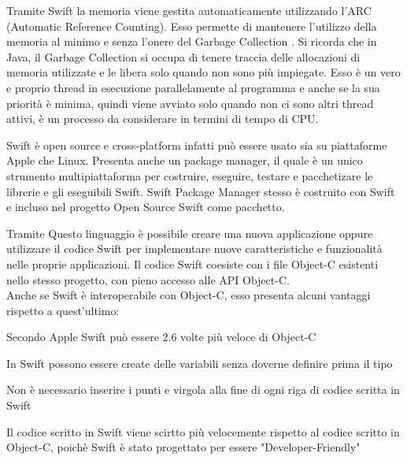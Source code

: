 Tramite Swift la memoria viene gestita automaticamente utilizzando l'ARC {}(Automatic Reference Counting). Esso permette di mantenere l'utilizzo della
memoria al minimo e senza l'onere del Garbage Collection \cite{GarbageCollector}. Si ricorda che in Java, il Garbage Collection si occupa di tenere traccia delle allocazioni di memoria utilizzate e le
libera solo quando non sono pi\`u impiegate. Esso \`e un vero e proprio thread in esecuzione parallelamente al programma e anche se la sua priorit\`a
\`e minima, quindi viene avviato solo quando non ci sono altri thread attivi, \`e  un processo da considerare in termini di tempo di CPU.

Swift \`e open source e cross-platform infatti pu\`o essere usato sia su piattaforme Apple che Linux. Presenta anche un package manager, il quale \`e un
unico strumento multipiattaforma per costruire, eseguire, testare e pacchetizare le librerie e gli eseguibili Swift. Swift Package Manager stesso \`e costruito con Swift
e incluso nel progetto Open Source Swift come pacchetto.

Tramite Questo linguaggio \`e possibile creare una nuova applicazione oppure utilizzare il codice Swift per implementare nuove caratteristiche e funzionalit\`a nelle proprie applicazioni.
Il codice Swift coesiste con i file Object-C esistenti nello stesso progetto, con pieno accesso alle API Object-C\cite{Apple:Com}.\\
Anche se Swift \`e interoperabile con Object-C, esso presenta alcuni vantaggi rispetto a quest'ultimo\cite{Swift:ObjectC}:
\begin{list}{*}{}
      \item Secondo Apple Swift pu\`o essere 2.6 volte pi\`u veloce di Object-C
      \item In Swift possono essere create delle variabili senza doverne definire prima il tipo
      \item Non \`e necessario inserire i punti e virgola alla fine di ogni riga di codice scritta in Swift
      \item Il codice scritto in Swift viene scirtto pi\`u velocemente rispetto al codice scritto in Object-C, poich\`e Swift \`e stato
            progettato per essere "Developer-Friendly"
\end{list}

